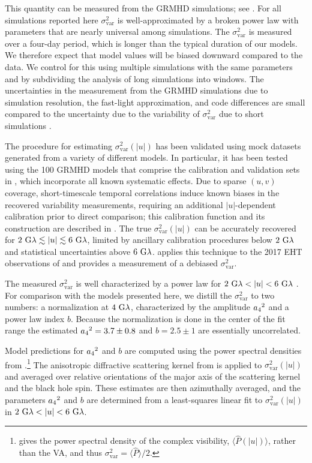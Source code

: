 This quantity can be measured from the GRMHD simulations; see \citet{Georgiev_2022}. For all simulations reported here $\sigma_\text{var}^2$ is well-approximated by a broken power law with parameters that are nearly universal among simulations.
The $\sigma_\text{var}^2$ is measured over a four-day period, which is longer than the typical duration of our models.  We therefore expect that model values will be biased downward compared to the data.  We control for this using multiple simulations with the same parameters and by subdividing the analysis of long simulations into windows.
The uncertainties in the measurement from the GRMHD simulations due to simulation resolution, the fast-light approximation, and code differences are small compared to the uncertainty due to the variability of $\sigma_\text{var}^2$ due to short simulations \citep{Georgiev_2022}.

The procedure for estimating $\sigma_\text{var}^2 (|u|)$ has been validated using mock datasets generated from a variety of different models.  In particular, it has been tested using the 100 GRMHD models that comprise the calibration and validation sets in , which incorporate all known systematic effects.  Due to sparse $(u,v)$ coverage, short-timescale temporal correlations induce known biases in the recovered variability measurements, requiring an additional $|u|$-dependent calibration prior to direct comparison; this calibration function and its construction are described in \citealt{NoiseModeling}.  The true $\sigma_\text{var}^2 (|u|)$ can be accurately recovered for $2~{\rm G}\lambda\lesssim|u|\lesssim6~{\rm G}\lambda$, limited by ancillary calibration procedures below $2~{\rm G}\lambda$ and statistical uncertainties above $6~{\rm G}\lambda$.   applies this technique to the 2017 EHT observations of \sgra and provides a measurement of a debiased $\sigma_\text{var}^2$.

The measured $\sigma_\text{var}^2$ is well characterized by a power law for $2~{\rm G}\lambda < |u| < 6~{\rm G}\lambda$ \citep{Georgiev_2022}.  For comparison with the models presented here, we distill the $\sigma_{\text{var}}^2$ to two numbers: a normalization at $4~{\rm G}\lambda$, characterized by the amplitude ${a_4}^2$ and a power law index $b$.  Because the normalization is done in the center of the fit range the estimated ${a_4}^2=3.7\pm0.8$ and $b=2.5\pm1$ are essentially uncorrelated.

Model predictions for ${a_4}^2$ and $b$ are computed using the power spectral densities from \citet{Georgiev_2022}.\footnote{\citet{Georgiev_2022} gives the power spectral density of the complex visibility, $\langle\hat{P}(|u|)\rangle$, rather than the VA, and thus $\sigma_\text{var}^2=\langle \hat{P}\rangle/2$. } The anisotropic diffractive scattering kernel from \citet{Johnson_2018} is applied to $\sigma_\text{var}^2(|u|)$ and averaged over relative orientations of the major axis of the scattering kernel and the black hole spin.  These estimates are then azimuthally averaged, and the parameters ${a_4}^2$ and $b$ are determined from a least-squares linear fit to $\sigma_\text{var}^2(|u|)$ in $2~{\rm G}\lambda < |u| < 6~{\rm G}\lambda$.
